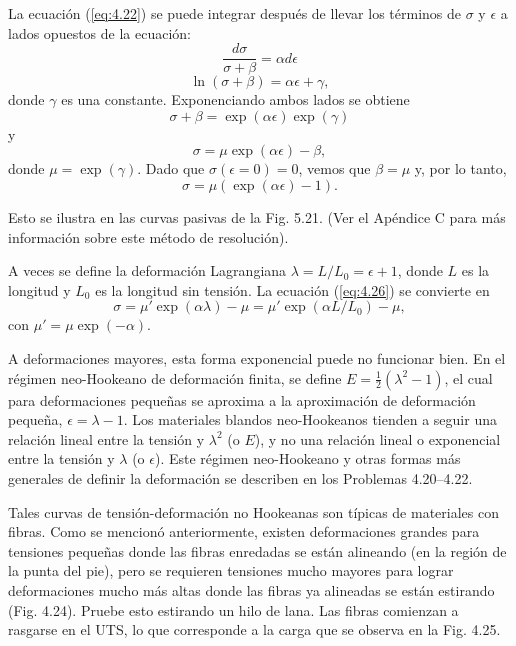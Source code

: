 \documentclass[12pt]{book}
\begin{document}
La ecuación (\ref{eq:4.22}) se puede integrar después de llevar los términos de $\sigma$ y $\epsilon$ a lados opuestos de la ecuación:
\begin{equation}
\frac{d\sigma}{\sigma + \beta} = \alpha d\epsilon
\label{eq:4.23}
\end{equation}
\begin{equation}
\ln(\sigma + \beta) = \alpha\epsilon + \gamma,
\label{eq:4.24}
\end{equation}
donde $\gamma$ es una constante. Exponenciando ambos lados se obtiene
\begin{equation*}
\sigma + \beta = \exp(\alpha\epsilon) \exp(\gamma)
\end{equation*}
y
\begin{equation}
\sigma = \mu \exp(\alpha\epsilon) - \beta,
\label{eq:4.25}
\end{equation}
donde $\mu = \exp(\gamma)$. Dado que $\sigma(\epsilon = 0) = 0$, vemos que $\beta = \mu$ y, por lo tanto,
\begin{equation}
\sigma = \mu(\exp(\alpha\epsilon) - 1).
\label{eq:4.26}
\end{equation}

Esto se ilustra en las curvas pasivas de la Fig. 5.21. (Ver el Apéndice C para más información sobre este método de resolución).

A veces se define la deformación Lagrangiana $\lambda = L/L_0 = \epsilon + 1$, donde $L$ es la longitud y $L_0$ es la longitud sin tensión. La ecuación (\ref{eq:4.26}) se convierte en
\begin{equation}
\sigma = \mu' \exp(\alpha\lambda) - \mu = \mu' \exp(\alpha L/L_0) - \mu,
\label{eq:4.27}
\end{equation}
con $\mu' = \mu \exp(- \alpha)$.

A deformaciones mayores, esta forma exponencial puede no funcionar bien. En el régimen neo-Hookeano de deformación finita, se define $E = \frac{1}{2}(\lambda^2 - 1)$, el cual para deformaciones pequeñas se aproxima a la aproximación de deformación pequeña, $\epsilon = \lambda - 1$. Los materiales blandos neo-Hookeanos tienden a seguir una relación lineal entre la tensión y $\lambda^2$ (o $E$), y no una relación lineal o exponencial entre la tensión y $\lambda$ (o $\epsilon$). Este régimen neo-Hookeano y otras formas más generales de definir la deformación se describen en los Problemas 4.20--4.22.

Tales curvas de tensión-deformación no Hookeanas son típicas de materiales con fibras. Como se mencionó anteriormente, existen deformaciones grandes para tensiones pequeñas donde las fibras enredadas se están alineando (en la región de la punta del pie), pero se requieren tensiones mucho mayores para lograr deformaciones mucho más altas donde las fibras ya alineadas se están estirando (Fig. 4.24). Pruebe esto estirando un hilo de lana. Las fibras comienzan a rasgarse en el UTS, lo que corresponde a la carga que se observa en la Fig. 4.25.
\end{document}
